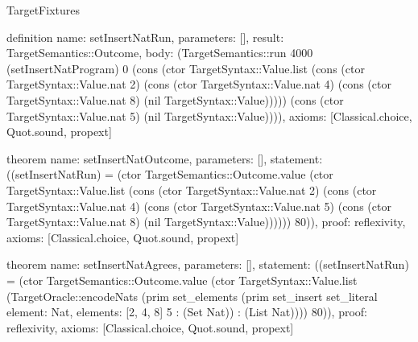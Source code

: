 \begin{lexlean}{TargetFixtures}
\begin{semanticmodule}
definition{
  name: setInsertNatRun,
  parameters: [],
  result: TargetSemantics::Outcome,
  body: (TargetSemantics::run 4000 (setInsertNatProgram) 0 (cons (ctor TargetSyntax::Value.list (cons (ctor TargetSyntax::Value.nat 2) (cons (ctor TargetSyntax::Value.nat 4) (cons (ctor TargetSyntax::Value.nat 8) (nil TargetSyntax::Value))))) (cons (ctor TargetSyntax::Value.nat 5) (nil TargetSyntax::Value)))),
  axioms: [Classical.choice, Quot.sound, propext]
}

theorem{
  name: setInsertNatOutcome,
  parameters: [],
  statement: ((setInsertNatRun) = (ctor TargetSemantics::Outcome.value (ctor TargetSyntax::Value.list (cons (ctor TargetSyntax::Value.nat 2) (cons (ctor TargetSyntax::Value.nat 4) (cons (ctor TargetSyntax::Value.nat 5) (cons (ctor TargetSyntax::Value.nat 8) (nil TargetSyntax::Value)))))) 80)),
  proof: reflexivity{},
  axioms: [Classical.choice, Quot.sound, propext]
}

theorem{
  name: setInsertNatAgrees,
  parameters: [],
  statement: ((setInsertNatRun) = (ctor TargetSemantics::Outcome.value (ctor TargetSyntax::Value.list (TargetOracle::encodeNats (prim set_elements (prim set_insert set_literal{
    element: Nat,
    elements: [2, 4, 8]
  } 5 : (Set Nat)) : (List Nat)))) 80)),
  proof: reflexivity{},
  axioms: [Classical.choice, Quot.sound, propext]
}


\end{semanticmodule}
\end{lexlean}
